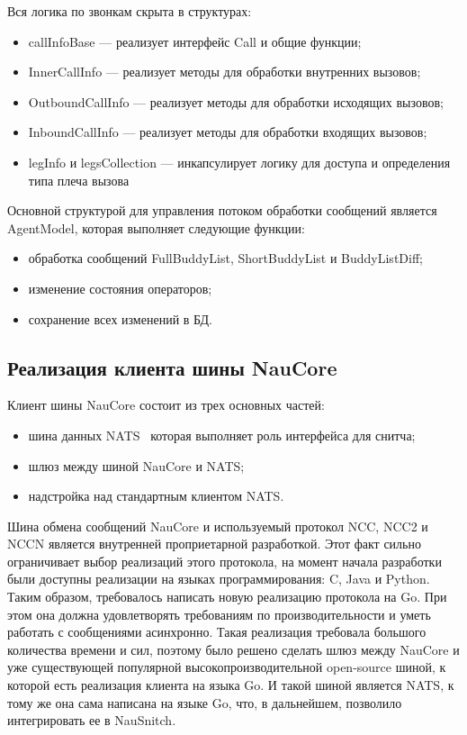 Вся логика по звонкам скрыта в структурах:
\begin{itemize}
    \item callInfoBase --- реализует интерфейс Call и общие функции;
    \item InnerCallInfo --- реализует методы для обработки внутренних вызовов; %
    \item OutboundCallInfo --- реализует методы для обработки исходящих вызовов;
    \item InboundCallInfo --- реализует методы для обработки входящих вызовов;
    \item legInfo и legsCollection --- инкапсулирует логику для доступа и определения типа плеча вызова~%
\end{itemize}


Основной структурой для управления потоком обработки сообщений является AgentModel, которая выполняет следующие функции:
\begin{itemize}
    \item обработка сообщений FullBuddyList, ShortBuddyList и BuddyListDiff;
    \item изменение состояния операторов;
    \item сохранение всех изменений в БД.
\end{itemize}

\subsection{Реализация клиента шины NauCore}

Клиент шины NauCore состоит из трех основных частей: %
\begin{itemize}
    \item шина данных NATS~%
    которая выполняет роль интерфейса для снитча; %
    \item шлюз между шиной NauCore и NATS;
    \item надстройка над стандартным клиентом NATS\@.
\end{itemize}

Шина обмена сообщений NauCore и используемый протокол NCC, NCC2 и NCCN является
внутренней проприетарной разработкой.
Этот факт сильно ограничивает выбор реализаций этого протокола,
на момент начала разработки были доступны реализации на языках программирования: C, Java и Python.
Таким образом, требовалось написать новую реализацию протокола на Go.
При этом она должна удовлетворять требованиям по производительности
и уметь работать с сообщениями асинхронно.
Такая реализация требовала большого количества времени и сил,
поэтому было решено сделать шлюз между NauCore и
уже существующей популярной высокопроизводительной open-source шиной,
к которой есть реализация клиента на языка Go.
И такой шиной является NATS, к тому же она сама написана на языке Go,
что, в дальнейшем, позволило интегрировать ее в NauSnitch.

